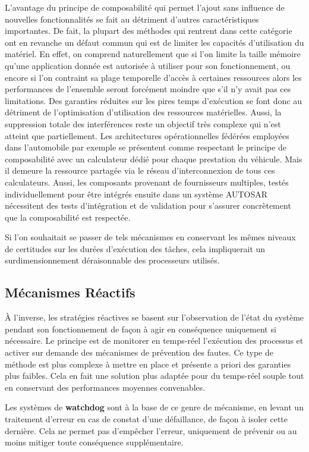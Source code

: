 \documentclass[french, a4paper, 11pt, twoside, pdftex]{StyleThese}
\begin{document}
		L'avantage du principe de composabilité qui permet l'ajout sans influence de nouvelles fonctionnalités se fait au détriment d'autres caractéristiques importantes. De fait, la plupart des méthodes qui rentrent dans cette catégorie ont en revanche un défaut commun qui est de limiter les capacités d'utilisation du matériel. En effet, on comprend naturellement que si l'on limite la taille mémoire qu'une application donnée est autorisée à utiliser pour son fonctionnement, ou encore si l'on contraint sa plage temporelle d'accès à certaines ressources alors les performances de l'ensemble seront forcément moindre que s'il n'y avait pas ces limitations. Des garanties réduites sur les pires temps d'exécution se font donc au détriment de l'optimisation d'utilisation des ressources matérielles. Aussi, la suppression totale des interférences reste un objectif très complexe qui n'est atteint que partiellement. Les architectures opérationnelles fédérées employées dans l'automobile par exemple se présentent comme respectant le principe de composabilité avec un calculateur dédié pour chaque prestation du véhicule. Mais il demeure la ressource partagée via le réseau d'interconnexion de tous ces calculateurs. Aussi, les composants provenant de fournisseurs multiples, testés individuellement pour être intégrés ensuite dans un système AUTOSAR nécessitent des tests d'intégration  et de validation pour s'assurer concrètement que la composabilité est respectée.
		
		Si l'on souhaitait se passer de tels mécanismes en conservant les mêmes niveaux de certitudes sur les durées d'exécution des tâches, cela impliquerait un surdimensionnement déraisonnable des processeurs utilisés. 

	\subsection{Mécanismes Réactifs}
		À l'inverse, les stratégies réactives se basent sur l'observation de l'état du système pendant son fonctionnement de façon à agir en conséquence uniquement si nécessaire. Le principe est de monitorer en temps-réel l'exécution des processus et activer sur demande des mécanismes de prévention des fautes. Ce type de méthode est plus complexe à mettre en place et présente a priori des garanties plus faibles. Cela en fait une solution plus adaptée pour du temps-réel souple tout en conservant des performances moyennes convenables. 
		
		Les systèmes de \textbf{watchdog} sont à la base de ce genre de mécanisme, en levant un traitement d'erreur en cas de constat d'une défaillance, de façon à isoler cette dernière. Cela ne permet pas d'empêcher l'erreur, uniquement de prévenir ou au moins mitiger  toute conséquence supplémentaire.
		
\end{document}
